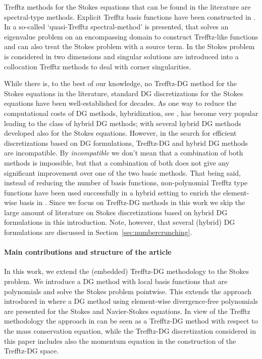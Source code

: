 \documentclass[pdflatex,sn-mathphys,Numbered]{sn-jnl}%
\theoremstyle{remark}%
\theoremstyle{definition}%
\begin{document}
Trefftz methods for the Stokes equations that can be found in the
literature are spectral-type methods. Explicit Trefftz basis functions
have been constructed in \cite{POITOU2000561,Bouberbachene}. In
\cite{LifitsQTSM} a so-called `quasi-Trefftz spectral-method' is
presented, that solves an eigenvalue problem on an encompassing domain
to construct Trefftz-like functions and can also treat the Stokes
problem with a source term. In \cite{21710} the Stokes problem is
considered in two dimensions and singular solutions are introduced
into a collocation Trefftz methods to deal with corner singularities.

While there is, to the best of our knowledge, no Trefftz-DG method for
the Stokes equations in the literature, standard DG discretizations
for the Stokes equations have been well-established for decades. As one
way to reduce the computational costs of DG methods, hybridization,
see \cite{cockburn2009unified}, has become very popular leading to the
class of hybrid DG methods; with several hybrid DG methods developed
also for the Stokes equations. However, in the search for efficient
discretizations based on DG formulations, Trefftz-DG and hybrid DG
methods are incompatible. By \emph{incompatible} we don't mean that a
combination of both methods is impossible, but that a combination of
both does not give any significant improvement over one of the two
basic methods. 
That being said, instead of reducing the number of basis functions, 
non-polynomial Trefftz type functions have been used successfully 
in a hybrid setting to enrich the element-wise basis in \cite{farhat2001}.
Since we focus on Trefftz-DG methods in this work we
skip the large amount of literature on Stokes discretizations based on
hybrid DG formulations in this introduction. Note, however, that
several (hybrid) DG formulations are discussed in
Section~\ref{sec:numbercrunching}.

\paragraph*{Main contributions and structure of the article}
In this work, we extend the (embedded) Trefftz-DG methodology to the
Stokes problem. We introduce a DG method with local basis functions
that are polynomials and solve the Stokes problem pointwise. This
extends the approach introduced in
\cite{montlaur2010discontinuous,montlaur08} where a DG method using
element-wise divergence-free polynomials are presented for the Stokes
and Navier-Stokes equations. In view of the Trefftz methodology the
approach in \cite{montlaur2010discontinuous,montlaur08} can be seen as
a Trefftz-DG method with respect to the mass conservation equation,
while the Trefftz-DG discretization considered in this paper includes
also the momentum equation in the construction of the Trefftz-DG
space. 
\end{document}

